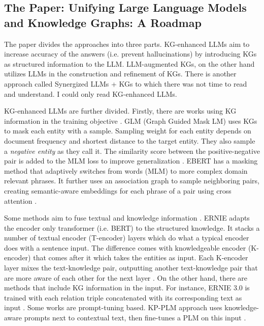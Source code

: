 \documentclass{article}
\begin{document}
\subsection{The Paper: Unifying Large Language Models and Knowledge Graphs: A Roadmap}\label{kgllm}

The paper divides the approaches into three parts. KG-enhanced LLMs aim to increase accuracy of the answers (i.e. prevent hallucinations) by introducing KGs as structured information to the LLM. LLM-augmented KGs, on the other hand utilizes LLMs in the construction and refinement of KGs. There is another approach called Synergized LLMs + KGs \cite{pan_unifying_2024} to which there was not time to read and understand. I could only read KG-enhanced LLMs.

KG-enhanced LLMs are further divided. Firstly, there are works using KG information in the training objective \cite{pan_unifying_2024}. GLM (Graph Guided Mask LM) uses KGs to mask each entity with a sample. Sampling weight for each entity depends on document frequency and shortest distance to the target entity. They also sample a \textit{negative entity} as they call it. The similarity score between the positive-negative pair is added to the MLM loss to improve generalization \cite{shen_exploiting_2020}. EBERT has a masking method that adaptively switches from words (MLM) to more complex domain relevant phrases. It further uses an association graph to sample neighboring pairs, creating semantic-aware embeddings for each phrase of a pair using cross attention \cite{zhang_e-bert_2021}.

Some methods aim to fuse textual and knowledge information \cite{pan_unifying_2024}. ERNIE adapts the encoder only transformer (i.e. BERT) to the structured knowledge. It stacks a number of textual encoder (T-encoder) layers which do what a typical encoder does with a sentence input. The difference comes with knowledgeable encoder (K-encoder) that comes after it which takes the entities as input. Each K-encoder layer mixes the text-knowledge pair, outputting another text-knowledge pair that are more aware of each other for the next layer \cite{zhang_ernie_2019}. On the other hand, there are methods that include KG information in the input. For instance, ERNIE 3.0 is trained with each relation triple concatenated with its corresponding text as input \cite{sun_ernie_2021}. Some works are prompt-tuning based. KP-PLM approach uses knowledge-aware prompts next to contextual text, then fine-tunes a PLM on this input \cite{wang_knowledge_2022}.
\end{document}
